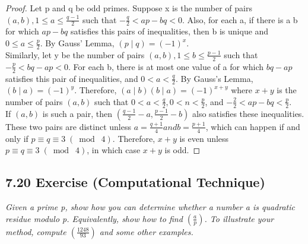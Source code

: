\documentclass{article}
\begin{document}
\begin{proof}
Let p and q be odd primes. Suppose x is the number of pairs $(a, b), 1 \leq a \leq \frac{q-1}{2}$ such that $-\frac{q}{2} < ap - bq < 0$. Also, for each a, if there is a b for which $ap - bq$ satisfies this pairs of inequalities, then b is unique and $0 \leq a \leq \frac{p}{2}$. By Gauss' Lemma, $(p \mid q) = (-1)^x$.\\

Similarly, let y be the number of pairs $(a, b), 1 \leq b \leq \frac{p-1}{2}$ such that $-\frac{p}{2} < bq - ap < 0$. For each b, there is at most one value of a for which $bq - ap$ satisfies this pair of inequalities, and $0 < a < \frac{q}{2}$. By Gauss’s Lemma, $(b \mid a) = (-1)^y$. Therefore, $(a \mid b)(b \mid a) = (-1)^{x+y}$ where $x + y$ is the number of pairs $(a, b)$ such that $0 < a < \frac{q}{2}, 0 < n < \frac{p}{2}$, and $-\frac{2}{2} < ap - bq < \frac{p}{2}$.\\

If $(a, b)$ is such a pair, then $(\frac{q-1}{2} - a, \frac{p-1}{2} - b)$ also satisfies these inequalities. These two pairs are distinct unless $a = \frac{q+1}{4} and b = \frac{p+1}{4}$, which can happen if and only if $p \equiv q \equiv 3 \;(\bmod\; 4)$. Therefore, $x+y$ is even unless $p \equiv q \equiv 3 \;(\bmod\; 4)$, in which case $x+y$ is odd.
\end{proof}

\subsection*{7.20 Exercise (Computational Technique)} 
\quad \textit{Given a prime p, show how you can determine whether a number a is quadratic residue modulo p. Equivalently, show how to find $(\frac{a}{p})$. To illustrate your method, compute $(\frac{1248}{93})$ and some other examples.}
\end{document}
